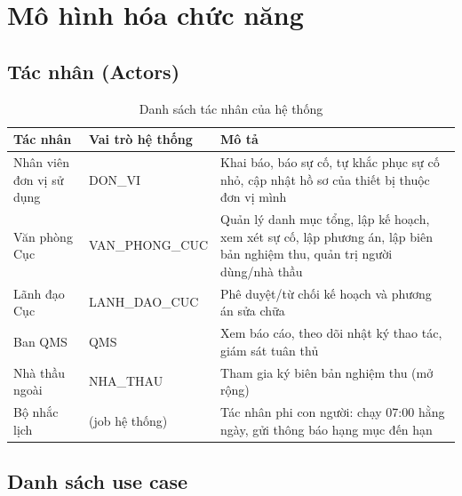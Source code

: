 \chapter{Mô hình hóa chức năng}

\section{Tác nhân (Actors)}

\begin{table}[h]
\centering
\caption{Danh sách tác nhân của hệ thống}
\label{tab:actors}
\begin{tabular}{P{3.6cm}P{4.2cm}P{7.2cm}}
\toprule
\textbf{Tác nhân} & \textbf{Vai trò hệ thống} & \textbf{Mô tả} \\
\midrule
Nhân viên đơn vị sử dụng & DON\_VI & Khai báo, báo sự cố, tự khắc phục sự cố nhỏ, cập nhật hồ sơ của thiết bị thuộc đơn vị mình \\
Văn phòng Cục & VAN\_PHONG\_CUC & Quản lý danh mục tổng, lập kế hoạch, xem xét sự cố, lập phương án, lập biên bản nghiệm thu, quản trị người dùng/nhà thầu \\
Lãnh đạo Cục & LANH\_DAO\_CUC & Phê duyệt/từ chối kế hoạch và phương án sửa chữa \\
Ban QMS & QMS & Xem báo cáo, theo dõi nhật ký thao tác, giám sát tuân thủ \\
Nhà thầu ngoài & NHA\_THAU & Tham gia ký biên bản nghiệm thu (mở rộng) \\
Bộ nhắc lịch & (job hệ thống) & Tác nhân phi con người: chạy 07:00 hằng ngày, gửi thông báo hạng mục đến hạn \\
\bottomrule
\end{tabular}
\end{table}

\section{Danh sách use case}

